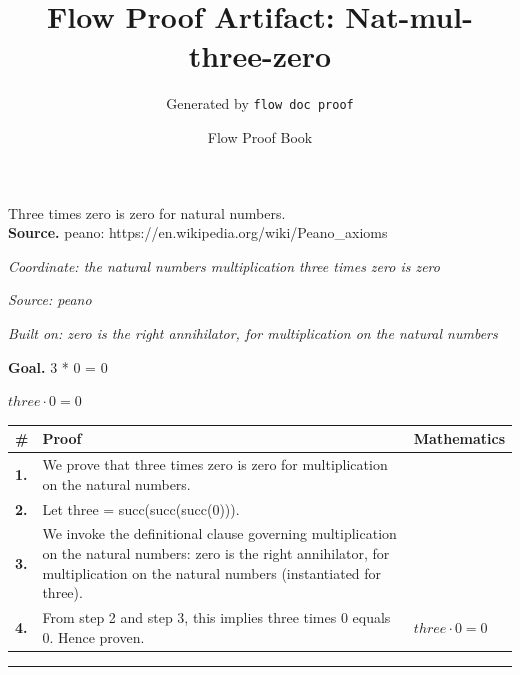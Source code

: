 \documentclass[11pt]{article}
\title{Flow Proof Artifact: Nat-mul-three-zero}
\author{Generated by \texttt{flow doc proof}}
\date{Flow Proof Book}
\theoremstyle{definition}
\begin{document}
\maketitle
Three times zero is zero for natural numbers.\\[0.5em]
\textbf{Source.} peano: https://en.wikipedia.org/wiki/Peano\_axioms\\[0.5em]
\bigskip
{}\par
\smallskip\noindent\textit{Coordinate: the natural numbers \cdot multiplication \cdot three times zero is zero}\par
\smallskip\noindent\textit{Source: peano}\par
\smallskip\noindent\textit{Built on: zero is the right annihilator, for multiplication on the natural numbers}\par
\medskip
\noindent\textbf{Goal.} 3 * 0 = 0\par
\noindent$\displaystyle three \cdot 0 = 0$\par
\medskip
\noindent
\begin{tabular}{@{} >{\raggedright\arraybackslash}p{} >{\raggedright\arraybackslash}p{} >{\raggedleft\arraybackslash}p{} @{}}
\textbf{\#} & \textbf{Proof} & \textbf{Mathematics} \\
\midrule
\textbf{1.} & We prove that three times zero is zero for multiplication on the natural numbers. & \\[0.45em]
\textbf{2.} & Let three = succ(succ(succ(0))). & \\[0.45em]
\textbf{3.} & We invoke the definitional clause governing multiplication on the natural numbers: zero is the right annihilator, for multiplication on the natural numbers (instantiated for three). & \\[0.45em]
\textbf{4.} & From step 2 and step 3, this implies three times 0 equals 0. Hence proven. & $\displaystyle three \cdot 0 = 0$ \\[0.45em]
\bottomrule
\end{tabular}
\label{thm:Nat-multiplication-three_times_zero_is_zero}
\par\medskip\hrule
\end{document}
